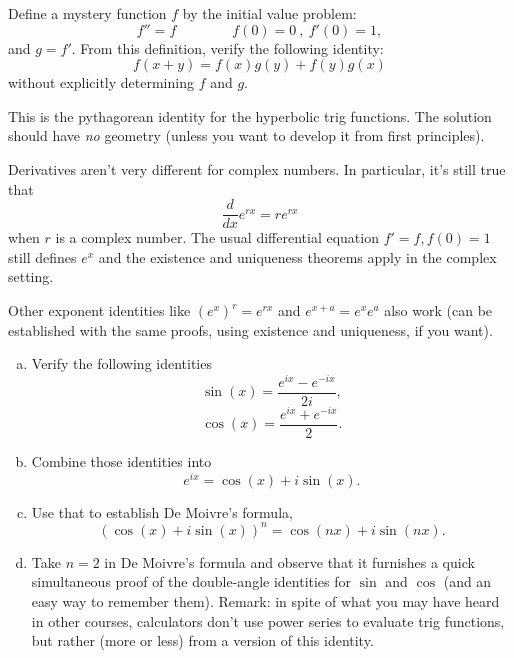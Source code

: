 \documentclass{article}
\begin{document}
\begin{problem}
    Define a mystery function \(f\) by the initial value problem:
    \[f'' = f\hspace{4em}f(0) = 0\ ,\ f'(0) = 1,\]
    and \(g=f'\). From this definition, verify the following identity:
    \[f(x+y) = f(x)g(y) + f(y)g(x)\]
    without explicitly determining \(f\) and \(g\).
    
    \hspace{2em}This is the pythagorean identity for the hyperbolic trig functions. The solution should have \emph{no} geometry (unless you want to develop it from first principles).
\end{problem}


\begin{problem}
    Derivatives aren't very different for complex numbers. In particular, it's still true that
    \[\frac{d}{dx} e^{rx} = re^{rx}\]
    when \(r\) is a complex number. The usual differential equation \(f'=f, f(0)=1\) still defines \(e^x\) and the existence and uniqueness theorems apply in the complex setting. 
    
    \hspace{2em}Other exponent identities like \((e^x)^r = e^{rx}\) and \(e^{x+a} = e^xe^a\) also work (can be established with the same proofs, using existence and uniqueness, if you want).
    \begin{enumerate}[a)]
        \item Verify the following identities
            \[\sin(x) = \frac{e^{ix} - e^{-ix}}{2i},\]
            \[\cos(x) = \frac{e^{ix} + e^{-ix}}{2}.\]
        \item Combine those identities into
            \[e^{ix} = \cos(x) + i\sin(x).\]
        \item Use that to establish De Moivre's formula,
            \[(\cos(x) + i\sin(x))^n = \cos(nx) + i\sin(nx).\]
        \item Take \(n=2\) in De Moivre's formula and observe that it furnishes a quick simultaneous proof of the double-angle identities for \(\sin\) and \(\cos\)  (and an easy way to remember them). Remark: in spite of what you may have heard in other courses, calculators don't use power series to evaluate trig functions, but rather (more or less) from a version of this identity.
    \end{enumerate}
\end{problem}
\end{document}
